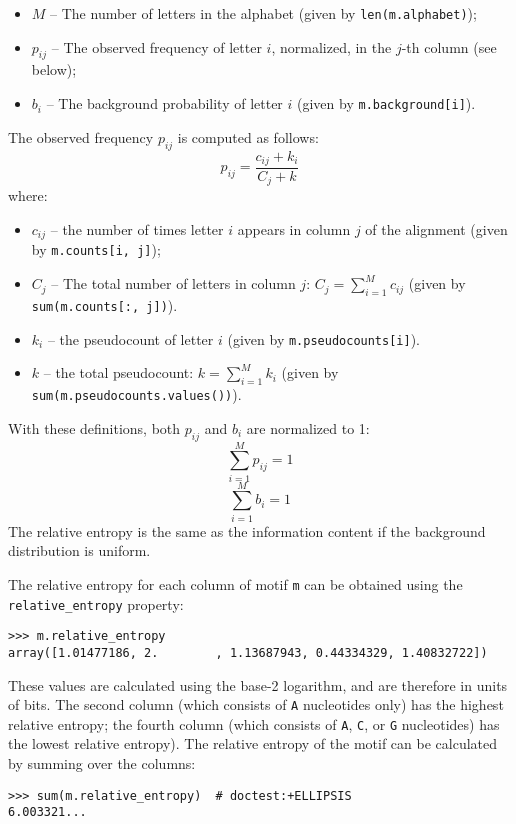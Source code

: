 \begin{itemize}
  \item $M$ -- The number of letters in the alphabet (given by \verb+len(m.alphabet)+);
  \item $p_{ij}$ -- The observed frequency of letter $i$, normalized, in the $j$-th column (see below);
  \item $b_{i}$ --  The background probability of letter $i$ (given by \verb+m.background[i]+).
\end{itemize}
The observed frequency $p_{ij}$ is computed as follows:
\begin{displaymath}
p_{ij} = \frac{c_{ij} + k_i}{C_{j} + k}
\end{displaymath}
\noindent where:
\begin{itemize}
  \item $c_{ij}$ -- the number of times letter $i$ appears in column $j$ of the alignment (given by \verb+m.counts[i, j]+);
  \item $C_{j}$ --  The total number of letters in column $j$: $C_{j} = \sum_{i=1}^{M} c_{ij}$ (given by \verb+sum(m.counts[:, j])+).
  \item $k_i$ -- the pseudocount of letter $i$ (given by \verb+m.pseudocounts[i]+).
  \item $k$ -- the total pseudocount: $k = \sum_{i=1}^{M} k_i$ (given by \verb+sum(m.pseudocounts.values())+).
\end{itemize}
With these definitions, both $p_{ij}$ and $b_{i}$ are normalized to 1:
\begin{displaymath}
\sum_{i=1}^{M} p_{ij} = 1
\end{displaymath}
\begin{displaymath}
\sum_{i=1}^{M} b_i = 1
\end{displaymath}
The relative entropy is the same as the information content if the background distribution is uniform.

The relative entropy for each column of motif \verb+m+ can be obtained using the \verb+relative_entropy+ property:
\begin{verbatim}
>>> m.relative_entropy
array([1.01477186, 2.        , 1.13687943, 0.44334329, 1.40832722])
\end{verbatim}
These values are calculated using the base-2 logarithm, and are therefore in units of bits. The second column (which consists of \verb+A+ nucleotides only) has the highest relative entropy; the fourth column (which consists of \verb+A+, \verb+C+, or \verb+G+ nucleotides) has the lowest relative entropy). The relative entropy of the motif can be calculated by summing over the columns:
\begin{verbatim}
>>> sum(m.relative_entropy)  # doctest:+ELLIPSIS
6.003321...
\end{verbatim}

